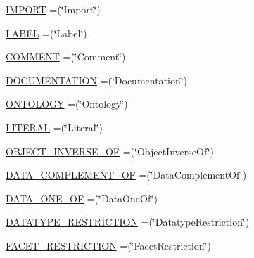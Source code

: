\begin{DoxyCompactItemize}
\item 
\hyperlink{enumorg_1_1semanticweb_1_1owlapi_1_1vocab_1_1_o_w_l_x_m_l_vocabulary_ae4e6c65b24eebef19b21e0e912c6d4b5}{I\-M\-P\-O\-R\-T} =(\char`\"{}Import\char`\"{})
\item 
\hyperlink{enumorg_1_1semanticweb_1_1owlapi_1_1vocab_1_1_o_w_l_x_m_l_vocabulary_aaea3092e31f5252d57da8e4d6b7ade5a}{L\-A\-B\-E\-L} =(\char`\"{}Label\char`\"{})
\item 
\hyperlink{enumorg_1_1semanticweb_1_1owlapi_1_1vocab_1_1_o_w_l_x_m_l_vocabulary_a89ef5156e26c62f0ba693b08d315697f}{C\-O\-M\-M\-E\-N\-T} =(\char`\"{}Comment\char`\"{})
\item 
\hyperlink{enumorg_1_1semanticweb_1_1owlapi_1_1vocab_1_1_o_w_l_x_m_l_vocabulary_a43e1666a58487d2e7a1b16c263913d49}{D\-O\-C\-U\-M\-E\-N\-T\-A\-T\-I\-O\-N} =(\char`\"{}Documentation\char`\"{})
\item 
\hyperlink{enumorg_1_1semanticweb_1_1owlapi_1_1vocab_1_1_o_w_l_x_m_l_vocabulary_a4378e5887b28e781c8796c9dc33d5cbc}{O\-N\-T\-O\-L\-O\-G\-Y} =(\char`\"{}Ontology\char`\"{})
\item 
\hyperlink{enumorg_1_1semanticweb_1_1owlapi_1_1vocab_1_1_o_w_l_x_m_l_vocabulary_ab0a4fd5927b1e947e0e4b10f98c19c45}{L\-I\-T\-E\-R\-A\-L} =(\char`\"{}Literal\char`\"{})
\item 
\hyperlink{enumorg_1_1semanticweb_1_1owlapi_1_1vocab_1_1_o_w_l_x_m_l_vocabulary_a239c2b9c35bf7b695560db2d2e1e5f75}{O\-B\-J\-E\-C\-T\-\_\-\-I\-N\-V\-E\-R\-S\-E\-\_\-\-O\-F} =(\char`\"{}Object\-Inverse\-Of\char`\"{})
\item 
\hyperlink{enumorg_1_1semanticweb_1_1owlapi_1_1vocab_1_1_o_w_l_x_m_l_vocabulary_a97a8757769acfaa06ff00579adc43cc7}{D\-A\-T\-A\-\_\-\-C\-O\-M\-P\-L\-E\-M\-E\-N\-T\-\_\-\-O\-F} =(\char`\"{}Data\-Complement\-Of\char`\"{})
\item 
\hyperlink{enumorg_1_1semanticweb_1_1owlapi_1_1vocab_1_1_o_w_l_x_m_l_vocabulary_aed9deee61ec91310ed589bf480856282}{D\-A\-T\-A\-\_\-\-O\-N\-E\-\_\-\-O\-F} =(\char`\"{}Data\-One\-Of\char`\"{})
\item 
\hyperlink{enumorg_1_1semanticweb_1_1owlapi_1_1vocab_1_1_o_w_l_x_m_l_vocabulary_abdd009f17bc41eb1d75952ed0c3675ec}{D\-A\-T\-A\-T\-Y\-P\-E\-\_\-\-R\-E\-S\-T\-R\-I\-C\-T\-I\-O\-N} =(\char`\"{}Datatype\-Restriction\char`\"{})
\item 
\hyperlink{enumorg_1_1semanticweb_1_1owlapi_1_1vocab_1_1_o_w_l_x_m_l_vocabulary_a1d222c2743faabc76600f5e9b6c8b469}{F\-A\-C\-E\-T\-\_\-\-R\-E\-S\-T\-R\-I\-C\-T\-I\-O\-N} =(\char`\"{}Facet\-Restriction\char`\"{})
\item 

\end{DoxyCompactItemize}
